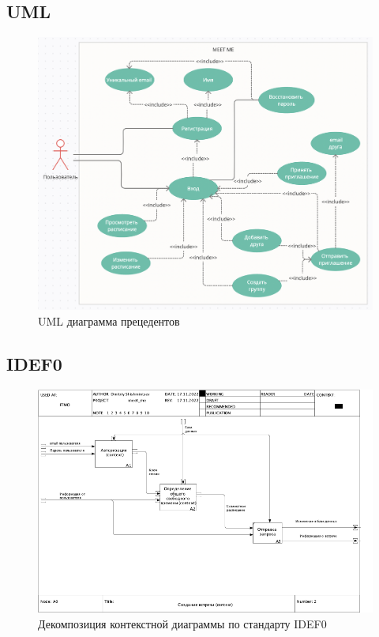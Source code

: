 \documentclass[aspectratio=169]{beamer}
\begin{document}
\subsection{UML}
\begin{frame}
    \begin{figure}
        \includegraphics[scale=.3]{img/d1.png}
        \caption{UML диаграмма прецедентов}
    \end{figure}
\end{frame}

\subsection{IDEF0}
\begin{frame}
    \begin{figure}
        \includegraphics[scale=.35]{img/IDEF0-1.png}
        \caption{Декомпозиция контекстной диаграммы по стандарту IDEF0}
    \end{figure}
\end{frame}
\end{document}
